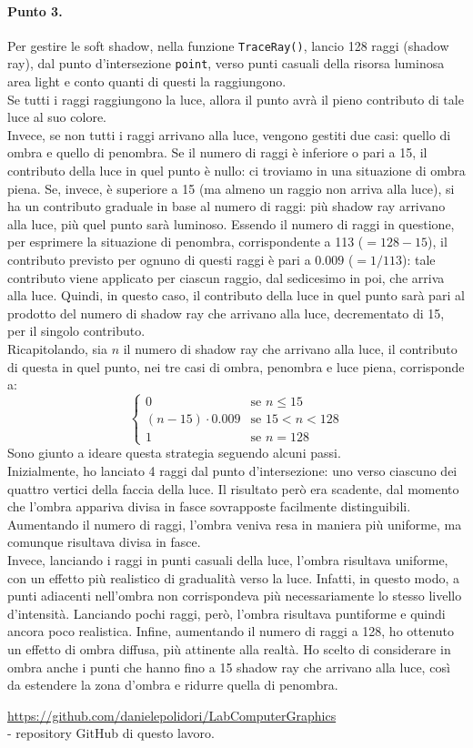 \documentclass[a4paper, 12pt]{article}
\begin{document}
\paragraph{Punto 3.}
Per gestire le soft shadow, nella funzione \texttt{TraceRay()}, lancio 128 raggi (shadow ray), dal punto d'intersezione \texttt{point}, verso punti casuali della risorsa luminosa area light e conto quanti di questi la raggiungono.\\
Se tutti i raggi raggiungono la luce, allora il punto avrà il pieno contributo di tale luce al suo colore.\\
Invece, se non tutti i raggi arrivano alla luce, vengono gestiti due casi: quello di ombra e quello di penombra. Se il numero di raggi è inferiore o pari a 15, il contributo della luce in quel punto è nullo: ci troviamo in una situazione di ombra piena. Se, invece, è superiore a 15 (ma almeno un raggio non arriva alla luce), si ha un contributo graduale in base al numero di raggi: più shadow ray arrivano alla luce, più quel punto sarà luminoso. Essendo il numero di raggi in questione, per esprimere la situazione di penombra, corrispondente a 113 ($= 128-15$), il contributo previsto per ognuno di questi raggi è pari a $0.009$ ($= 1/113$): tale contributo viene applicato per ciascun raggio, dal sedicesimo in poi, che arriva alla luce. Quindi, in questo caso, il contributo della luce in quel punto sarà pari al prodotto del numero di shadow ray che arrivano alla luce, decrementato di 15, per il singolo contributo.\\
Ricapitolando, sia $n$ il numero di shadow ray che arrivano alla luce, il contributo di questa in quel punto, nei tre casi di ombra, penombra e luce piena, corrisponde a:
\[
  \begin{cases}
    0                     & \text{se $n \leq 15$}     \\
    (n - 15) \cdot 0.009  & \text{se $15 < n < 128$}  \\
    1                     & \text{se $n = 128$}
  \end{cases}
\]
Sono giunto a ideare questa strategia seguendo alcuni passi.\\
Inizialmente, ho lanciato 4 raggi dal punto d'intersezione: uno verso ciascuno dei quattro vertici della faccia della luce. Il risultato però era scadente, dal momento che l'ombra appariva divisa in fasce sovrapposte facilmente distinguibili. Aumentando il numero di raggi, l'ombra veniva resa in maniera più uniforme, ma comunque risultava divisa in fasce.\\
Invece, lanciando i raggi in punti casuali della luce, l'ombra risultava uniforme, con un effetto più realistico di gradualità verso la luce. Infatti, in questo modo, a punti adiacenti nell'ombra non corrispondeva più necessariamente lo stesso livello d'intensità. Lanciando pochi raggi, però, l'ombra risultava puntiforme e quindi ancora poco realistica. Infine, aumentando il numero di raggi a 128, ho ottenuto un effetto di ombra diffusa, più attinente alla realtà. Ho scelto di considerare in ombra anche i punti che hanno fino a 15 shadow ray che arrivano alla luce, così da estendere la zona d'ombra e ridurre quella di penombra.


\begin{thebibliography}{90}
 \url{https://github.com/danielepolidori/LabComputerGraphics}\\
- repository GitHub di questo lavoro.
\end{thebibliography}
\end{document}

